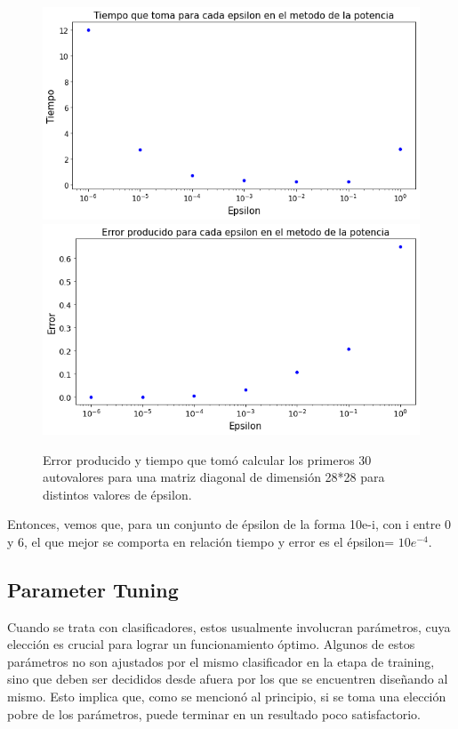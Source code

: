 \documentclass[a4paper]{article}
\begin{document}
        
        \begin{figure}[H]
            \begin{center}
                \includegraphics[scale=0.36]{img/explicaciones/eps_time.png}
                \includegraphics[scale=0.36]{img/explicaciones/eps_error.png}
                \caption{Error producido y tiempo que tomó calcular los primeros 30 autovalores para una matriz diagonal de dimensión 28*28 para distintos valores de épsilon.}
            \end{center}
        \end{figure}
        
        Entonces, vemos que, para un conjunto de épsilon de la forma 10e-i, con i entre 0 y 6, el que mejor se comporta en relación tiempo y error es el épsilon= $10e^{-4}$.
        
     
    \subsection{Parameter Tuning}
    Cuando se trata con clasificadores, estos usualmente involucran parámetros, cuya elección es crucial para lograr un funcionamiento óptimo. Algunos de estos parámetros no son ajustados por el mismo clasificador en la etapa de training, sino que deben ser decididos desde afuera por los que se encuentren diseñando al mismo. Esto implica que, como se mencionó al principio, si se toma una elección pobre de los parámetros, puede terminar en un resultado poco satisfactorio.
    
\end{document}

